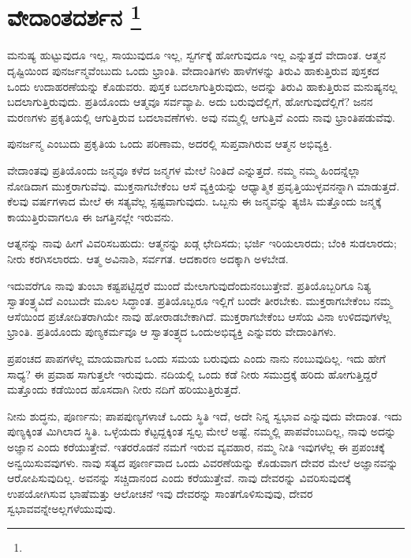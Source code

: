 
\chapter[ವೇದಾಂತದರ್ಶನ]{ವೇದಾಂತದರ್ಶನ \protect\footnote{}}

ಮನುಷ್ಯ ಹುಟ್ಟುವುದೂ ಇಲ್ಲ, ಸಾಯುವುದೂ ಇಲ್ಲ, ಸ್ವರ್ಗಕ್ಕೆ ಹೋಗುವುದೂ ಇಲ್ಲ ಎನ್ನುತ್ತದೆ ವೇದಾಂತ. ಆತ್ಮನ ದೃಷ್ಟಿಯಿಂದ ಪುನರ್ಜನ್ಮವೆಂಬುದು ಒಂದು ಭ್ರಾಂತಿ. ವೇದಾಂತಿಗಳು ಹಾಳೆಗಳನ್ನು ತಿರುವಿ ಹಾಕುತ್ತಿರುವ ಪುಸ್ತಕದ ಒಂದು ಉದಾಹರಣೆಯನ್ನು ಕೊಡುವರು. ಪುಸ್ತಕ ಬದಲಾಗುತ್ತಿರುವುದು, ಅದನ್ನು ತಿರುವಿ ಹಾಕುತ್ತಿರುವ ಮನುಷ್ಯನಲ್ಲ ಬದಲಾಗುತ್ತಿರುವುದು. ಪ್ರತಿಯೊಂದು ಆತ್ಮವೂ ಸರ್ವವ್ಯಾಪಿ. ಅದು ಬರುವುದೆಲ್ಲಿಗೆ, ಹೋಗುವುದೆಲ್ಲಿಗೆ? ಜನನ ಮರಣಗಳು ಪ್ರಕೃತಿಯಲ್ಲಿ ಆಗುತ್ತಿರುವ ಬದಲಾವಣೆಗಳು. ಅವು ನಮ್ಮಲ್ಲಿ ಆಗುತ್ತಿವೆ ಎಂದು ನಾವು ಭ್ರಾಂತಿಪಡುವೆವು.

\vskip 6pt

ಪುನರ್ಜನ್ಮ ಎಂಬುದು ಪ್ರಕೃತಿಯ ಒಂದು ಪರಿಣಾಮ, ಅದರಲ್ಲಿ ಸುಪ್ತವಾಗಿರುವ ಆತ್ಮನ ಅಭಿವ್ಯಕ್ತಿ.

\vskip 6pt

ವೇದಾಂತವು ಪ್ರತಿಯೊಂದು ಜನ್ಮವೂ ಕಳೆದ ಜನ್ಮಗಳ ಮೇಲೆ ನಿಂತಿದೆ ಎನ್ನುತ್ತದೆ. ನಮ್ಮ ನಮ್ಮ ಹಿಂದನ್ನೆಲ್ಲಾ ನೋಡಿದಾಗ ಮುಕ್ತರಾಗುವೆವು. ಮುಕ್ತನಾಗಬೇಕೆಂಬ ಆಸೆ ವ್ಯಕ್ತಿಯನ್ನು ಆಧ್ಯಾತ್ಮಿಕ ಪ್ರವೃತ್ತಿಯುಳ್ಳವನನ್ನಾಗಿ ಮಾಡುತ್ತದೆ. ಕೆಲವು ವರ್ಷಗಳಾದ ಮೇಲೆ ಈ ಸತ್ಯವೆಲ್ಲ ಸ್ಪಷ್ಟವಾಗುವುದು. ಒಬ್ಬನು ಈ ಜನ್ಮವನ್ನು ತ್ಯಜಿಸಿ ಮತ್ತೊಂದು ಜನ್ಮಕ್ಕೆ ಕಾಯುತ್ತಿರುವಾಗಲೂ ಈ ಜಗತ್ತಿನಲ್ಲೇ ಇರುವನು.

\vskip 6pt

ಆತ್ನನನ್ನು ನಾವು ಹೀಗೆ ವಿವರಿಸಬಹುದು: ಆತ್ಮನನ್ನು ಖಡ್ಗ ಛೇದಿಸದು; ಭರ್ಜಿ ಇರಿಯಲಾರದು; ಬೆಂಕಿ ಸುಡಲಾರದು; ನೀರು ಕರಗಿಸಲಾರದು. ಆತ್ಮ ಅವಿನಾಶಿ, ಸರ್ವಗತ. ಆದಕಾರಣ ಅದಕ್ಕಾಗಿ ಅಳಬೇಡ.

\vskip 6pt

ಇದುವರೆಗೂ ನಾವು ತುಂಬಾ ಕಷ್ಟಪಟ್ಟಿದ್ದರೆ ಮುಂದೆ ಮೇಲಾಗುವುದೆಂದು\break ನಂಬುತ್ತೇವೆ. ಪ್ರತಿಯೊಬ್ಬರಿಗೂ ನಿತ್ಯ ಸ್ವಾತಂತ್ರ್ಯವಿದೆ ಎಂಬುದೇ ಮೂಲ ಸಿದ್ಧಾಂತ. ಪ್ರತಿಯೊಬ್ಬರೂ ಇಲ್ಲಿಗೆ ಬಂದೇ ತೀರಬೇಕು. ಮುಕ್ತರಾಗಬೇಕೆಂಬ ನಮ್ಮ ಆಸೆಯಿಂದ ಪ್ರಚೋದಿತರಾಗಿಯೇ ನಾವು ಹೋರಾಡಬೇಕಾಗಿದೆ. ಮುಕ್ತರಾಗಬೇಕೆಂಬ ಆಸೆಯ ವಿನಾ ಉಳಿದವುಗಳೆಲ್ಲ ಭ್ರಾಂತಿ. ಪ್ರತಿಯೊಂದು ಪುಣ್ಯಕರ್ಮವೂ ಆ ಸ್ವಾತಂತ್ರ್ಯದ ಒಂದು\break ಅಭಿವ್ಯಕ್ತಿ ಎನ್ನುವರು ವೇದಾಂತಿಗಳು.

\vskip 6pt

ಪ್ರಪಂಚದ ಪಾಪಗಳೆಲ್ಲ ಮಾಯವಾಗುವ ಒಂದು ಸಮಯ ಬರುವುದು ಎಂದು ನಾನು ನಂಬುವುದಿಲ್ಲ. ಇದು ಹೇಗೆ ಸಾಧ್ಯ? ಈ ಪ್ರವಾಹ ಸಾಗುತ್ತಲೇ ಇರುವುದು. ನದಿಯಲ್ಲಿ ಒಂದು ಕಡೆ ನೀರು ಸಮುದ್ರಕ್ಕೆ ಹರಿದು ಹೋಗುತ್ತಿದ್ದರೆ ಮತ್ತೊಂದು ಕಡೆಯಿಂದ ಹೊಸದಾಗಿ ನೀರು ನದಿಗೆ ಹರಿಯುತ್ತಿರುತ್ತದೆ.

\vskip 6pt

ನೀನು ಶುದ್ಧನು, ಪೂರ್ಣನು; ಪಾಪಪುಣ್ಯಗಳಾಚೆ ಒಂದು ಸ್ಥಿತಿ ಇದೆ, ಅದೇ ನಿನ್ನ ಸ್ವಭಾವ ಎನ್ನುವುದು ವೇದಾಂತ. ಇದು ಪುಣ್ಯಕ್ಕಿಂತ ಮಿಗಿಲಾದ ಸ್ಥಿತಿ. ಒಳ್ಳೆಯದು ಕೆಟ್ಟದ್ದಕ್ಕಿಂತ ಸ್ವಲ್ಪ ಮೇಲೆ ಅಷ್ಟೆ. ನಮ್ಮಲ್ಲಿ ಪಾಪವೆಂಬುದಿಲ್ಲ, ನಾವು ಅದನ್ನು ಅಜ್ಞಾನ ಎಂದು ಕರೆಯುತ್ತೇವೆ. ಇತರರೊಡನೆ ನಮಗೆ ಇರುವ ವ್ಯವಹಾರ, ನಮ್ಮ ನೀತಿ ಇವುಗಳೆಲ್ಲ ಈ ಪ್ರಪಂಚಕ್ಕೆ ಅನ್ವಯಿಸುವವುಗಳು. ನಾವು ಸತ್ಯದ ಪೂರ್ಣವಾದ ಒಂದು ವಿವರಣೆಯನ್ನು ಕೊಡುವಾಗ ದೇವರ ಮೇಲೆ ಅಜ್ಞಾನವನ್ನು ಆರೋಪಿಸುವುದಿಲ್ಲ. ಅವನನ್ನು ಸಚ್ಚಿದಾನಂದ ಎಂದು ಕರೆಯುತ್ತೇವೆ. ನಾವು ದೇವರನ್ನು ವಿವರಿಸುವುದಕ್ಕೆ ಉಪಯೋಗಿಸುವ ಭಾಷೆ\break ಮತ್ತು ಆಲೋಚನೆ ಇವು ದೇವರನ್ನು ಸಾಂತಗೊಳಿಸುವುವು, ದೇವರ ಸ್ವಭಾವವನ್ನೇ\break ಅಲ್ಲಗಳೆಯುವುವು.

